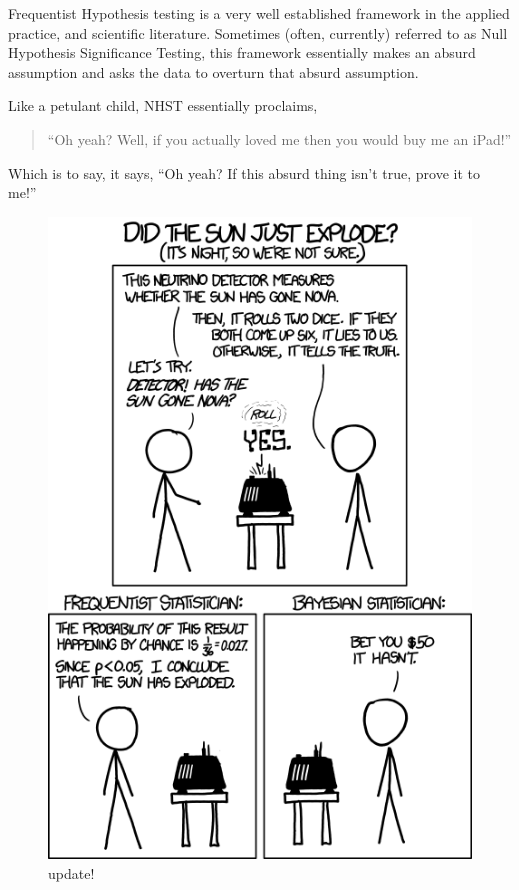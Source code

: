 \documentclass[
]{book}
\theoremstyle{definition}
\theoremstyle{definition}
\theoremstyle{definition}
\theoremstyle{definition}
\theoremstyle{remark}
\begin{document}
Frequentist Hypothesis testing is a very well established framework in the applied practice, and scientific literature. Sometimes (often, currently) referred to as Null Hypothesis Significance Testing, this framework essentially makes an absurd assumption and asks the data to overturn that absurd assumption.

Like a petulant child, NHST essentially proclaims,

\begin{quote}
``Oh yeah? Well, if you actually loved me then you would buy me an iPad!''
\end{quote}

Which is to say, it says, ``Oh yeah? If this absurd thing isn't true, prove it to me!''

\begin{figure}
\centering
\includegraphics{./images/frequentists_vs_bayesians.png}
\caption{update!}
\end{figure}
\end{document}
